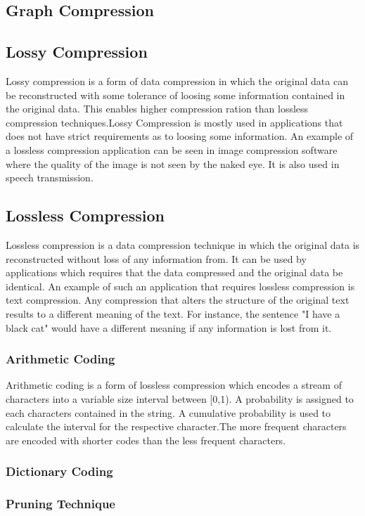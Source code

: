 \subsection{Graph Compression}

\subsection{Lossy Compression}

Lossy compression is a form of data compression in which the original data can be reconstructed with some tolerance of loosing some information contained in the original data. This enables higher compression ration than lossless compression techniques.Lossy Compression is mostly used in applications that does not have strict requirements as to loosing some information. An example of a lossless compression application can be seen in image compression software where the quality of the image is not seen by the naked eye. It is also used in speech transmission. 

\subsection{Lossless Compression}
Lossless compression is a data compression technique in which the original data is reconstructed without loss of any information from. It can be used by applications which requires that the data compressed and the original data be identical. An example of such an application that requires lossless compression is text compression.  Any compression that alters the structure of the original text results to a different meaning of the text. For instance, the sentence "I have a black cat" would have a different meaning if any information is lost from it.



\subsubsection{Arithmetic Coding}

Arithmetic coding is a form of lossless compression which encodes a stream of characters into a variable size interval between [0,1). A probability is assigned to each characters contained in the string. A cumulative probability is used to calculate the interval for the respective character.The more frequent characters are encoded with shorter codes than the less frequent characters. 

\subsubsection{Dictionary Coding}



\subsubsection{Pruning Technique} 









